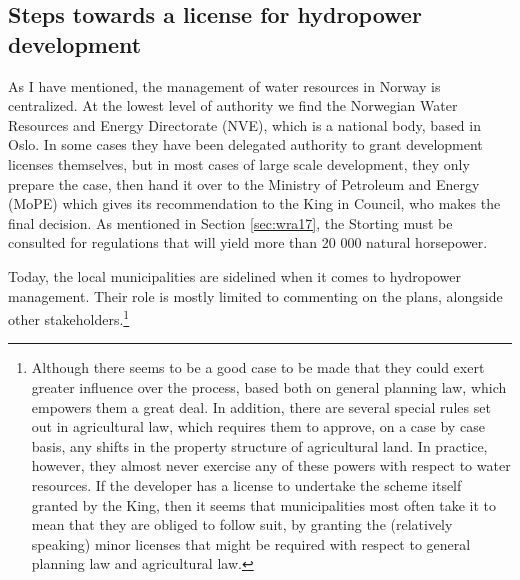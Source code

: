 %
%

\subsection{Steps towards a license for hydropower development}\label{sec:step}

As I have mentioned, the management of water resources in Norway is centralized. At the lowest level of authority we find the Norwegian Water Resources and Energy Directorate (NVE), which is a national body, based in Oslo. In some cases they have been delegated authority to grant development licenses themselves, but in most cases of large scale development, they only prepare the case, then hand it over to the Ministry of Petroleum and Energy (MoPE) which gives its recommendation to the King in Council, who makes the final decision. As mentioned in Section \ref{sec:wra17}, the Storting must be consulted for regulations that will yield more than 20 000 natural horsepower. 

Today, the local municipalities are sidelined when it comes to hydropower management. Their role is mostly limited to commenting on the plans, alongside other stakeholders.\footnote{Although there seems to be a good case to be made that they could exert greater influence over the process, based both on general planning law, which empowers them a great deal. In addition, there are several special rules set out in agricultural law, which requires them to approve, on a case by case basis, any shifts in the property structure of agricultural land. In practice, however, they almost never exercise any of these powers with respect to water resources. If the developer has a license to undertake the scheme itself granted by the King, then it seems that municipalities most often take it to mean that they are obliged to follow suit, by granting the (relatively speaking) minor licenses that might be required with respect to general planning law and agricultural law.} %

